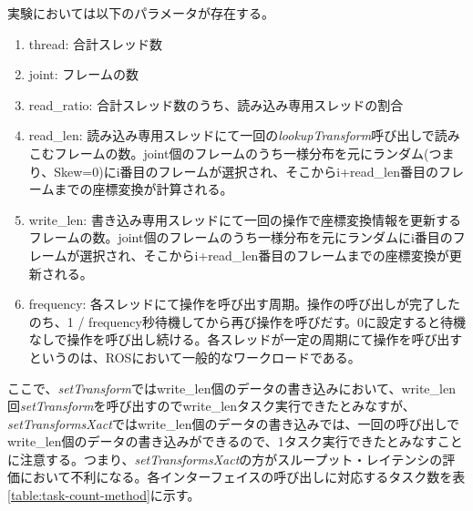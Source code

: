 \documentclass[a4paper]{jreport}	%
\begin{document}
実験においては以下のパラメータが存在する。
\begin{enumerate}
  \item thread: 合計スレッド数
  \item joint: フレームの数
  \item read\_ratio: 合計スレッド数のうち、読み込み専用スレッドの割合
  \item read\_len: 読み込み専用スレッドにて一回の\textit{lookupTransform}呼び出しで読みこむフレームの数。joint個のフレームのうち一様分布を元にランダム(つまり、Skew=0)にi番目のフレームが選択され、そこからi+read\_len番目のフレームまでの座標変換が計算される。
  \item write\_len: 書き込み専用スレッドにて一回の操作で座標変換情報を更新するフレームの数。joint個のフレームのうち一様分布を元にランダムにi番目のフレームが選択され、そこからi+read\_len番目のフレームまでの座標変換が更新される。
  \item frequency: 各スレッドにて操作を呼び出す周期。操作の呼び出しが完了したのち、1 / frequency秒待機してから再び操作を呼びだす。0に設定すると待機なしで操作を呼び出し続ける。各スレッドが一定の周期にて操作を呼び出すというのは、ROSにおいて一般的なワークロードである。
\end{enumerate}


ここで、\textit{setTransform}ではwrite\_len個のデータの書き込みにおいて、write\_len回\textit{setTransform}を呼び出すのでwrite\_lenタスク実行できたとみなすが、\textit{setTransformsXact}ではwrite\_len個のデータの書き込みでは、一回の呼び出しでwrite\_len個のデータの書き込みができるので、1タスク実行できたとみなすことに注意する。つまり、\textit{setTransformsXact}の方がスループット・レイテンシの評価において不利になる。各インターフェイスの呼び出しに対応するタスク数を表\ref{table:task-count-method}に示す。
\end{document}
